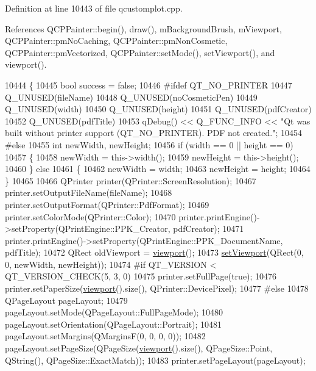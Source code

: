 Definition at line 10443 of file qcustomplot.\+cpp.



References Q\+C\+P\+Painter\+::begin(), draw(), m\+Background\+Brush, m\+Viewport, Q\+C\+P\+Painter\+::pm\+No\+Caching, Q\+C\+P\+Painter\+::pm\+Non\+Cosmetic, Q\+C\+P\+Painter\+::pm\+Vectorized, Q\+C\+P\+Painter\+::set\+Mode(), set\+Viewport(), and viewport().


\begin{DoxyCode}
10444 \{
10445   \textcolor{keywordtype}{bool} success = \textcolor{keyword}{false};
10446 \textcolor{preprocessor}{#ifdef QT\_NO\_PRINTER}
10447   Q\_UNUSED(fileName)
10448   Q\_UNUSED(noCosmeticPen)
10449   Q\_UNUSED(width)
10450   Q\_UNUSED(height)
10451   Q\_UNUSED(pdfCreator)
10452   Q\_UNUSED(pdfTitle)
10453   qDebug() << Q\_FUNC\_INFO << "Qt was built without printer support (QT\_NO\_PRINTER). PDF not created.";
10454 \textcolor{preprocessor}{#else}
10455   \textcolor{keywordtype}{int} newWidth, newHeight;
10456   \textcolor{keywordflow}{if} (width == 0 || height == 0)
10457   \{
10458     newWidth = this->width();
10459     newHeight = this->height();
10460   \} \textcolor{keywordflow}{else}
10461   \{
10462     newWidth = width;
10463     newHeight = height;
10464   \}
10465   
10466   QPrinter printer(QPrinter::ScreenResolution);
10467   printer.setOutputFileName(fileName);
10468   printer.setOutputFormat(QPrinter::PdfFormat);
10469   printer.setColorMode(QPrinter::Color);
10470   printer.printEngine()->setProperty(QPrintEngine::PPK\_Creator, pdfCreator);
10471   printer.printEngine()->setProperty(QPrintEngine::PPK\_DocumentName, pdfTitle);
10472   QRect oldViewport = \hyperlink{class_q_custom_plot_a953ecdbc28018e7e84cb6213ad3d88c2}{viewport}();
10473   \hyperlink{class_q_custom_plot_a3f9bc4b939dd8aaba9339fd09f273fc4}{setViewport}(QRect(0, 0, newWidth, newHeight));
10474 \textcolor{preprocessor}{#if QT\_VERSION < QT\_VERSION\_CHECK(5, 3, 0)}
10475   printer.setFullPage(\textcolor{keyword}{true});
10476   printer.setPaperSize(\hyperlink{class_q_custom_plot_a953ecdbc28018e7e84cb6213ad3d88c2}{viewport}().size(), QPrinter::DevicePixel);
10477 \textcolor{preprocessor}{#else}
10478   QPageLayout pageLayout;
10479   pageLayout.setMode(QPageLayout::FullPageMode);
10480   pageLayout.setOrientation(QPageLayout::Portrait);
10481   pageLayout.setMargins(QMarginsF(0, 0, 0, 0));
10482   pageLayout.setPageSize(QPageSize(\hyperlink{class_q_custom_plot_a953ecdbc28018e7e84cb6213ad3d88c2}{viewport}().size(), QPageSize::Point, QString(), 
      QPageSize::ExactMatch));
10483   printer.setPageLayout(pageLayout);

\end{DoxyCode}

